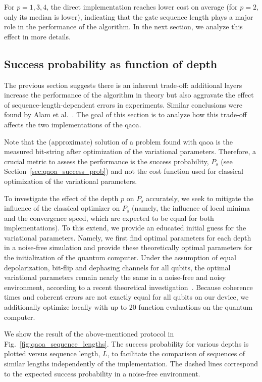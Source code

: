 For $p = 1,3,4$, the direct implementation reaches lower cost on average (for $p=2$, only its median is lower), indicating that the gate sequence length plays a major role in the performance of the algorithm. In the next section, we analyze this effect in more details. 

\subsection{Success probability as function of depth}
The previous section suggests there is an inherent trade-off: additional layers increase the performance of the algorithm in theory but also aggravate the effect of sequence-length-dependent errors in experiments. Similar conclusions were found by Alam et al.~\cite{Alam2019AnalysisQubits}. The goal of this section is to analyze how this trade-off affects the two implementations of the \gls{qaoa}.

Note that the (approximate) solution of a problem found with \gls{qaoa} is the measured bit-string after optimization of the variational parameters. Therefore, a crucial metric to assess the performance is the success probability, $P_s$ (see Section~\ref{sec:qaoa_success_prob}) and not the cost function used for classical optimization of the variational parameters. 

To investigate the effect of the depth $p$ on $P_s$ accurately, we seek to mitigate the influence of the classical optimizer on $P_s$ (namely, the influence of local minima and the convergence speed, which are expected to be equal for both implementations). To this extend, we provide an educated initial guess for the variational parameters. Namely, we first find optimal parameters for each depth in a noise-free simulation and provide these theoretically optimal parameters for the initialization of the quantum computer. Under the assumption of equal depolarization, bit-flip and dephasing channels for all qubits, the optimal variational parameters remain nearly the same in a noise-free and noisy environment, according to a recent theoretical investigation~\cite{Xue2019EffectsAlgorithm}. Because coherence times and coherent errors are not exactly equal for all qubits on our device, we additionally optimize locally with up to 20 function evaluations on the quantum computer. 

We show the result of the above-mentioned protocol in Fig.~\ref{fig:qaoa_sequence_lengths}. The success probability for various depths is plotted versus sequence length, $L$, to facilitate the comparison of sequences of similar lengths independently of the implementation. The dashed lines correspond to the expected success probability in a noise-free environment. 

